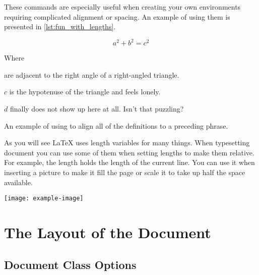 These commands are especially useful when creating your own environments
requiring complicated alignment or spacing. An example of using them is
presented in \autoref{lst:fun_with_lengths}.

\begin{listing}
  \begin{example}[vertical_mode, examplewidth=0.85\linewidth]
\newlength{\vardescindent}

\[  a^2+b^2=c^2 \]
\begin{vardesc}{Where}
  \item*[\(a\), \(b\)] are adjacent to the right angle
    of a right-angled triangle.
  \item[\(c\)] is the hypotenuse of the triangle and
    feels lonely.
  \item[\(d\)] finally does not show up here at all.
    Isn't that puzzling?
\end{vardesc}
\end{example}
  \caption{An example of using  to align all of the
    definitions to a preceding phrase.}\label{lst:fun_with_lengths}
\end{listing}

As you will see \LaTeX{} uses length variables for many things. When
typesetting document you can use some of them when setting lengths to make them
relative. For example, the  length holds the length of the
current line. You can use it when inserting a picture to make it fill the page
or scale it to take up half the space available.
\begin{example}
\texttt{[image: example-image]}
\end{example}

\section{The Layout of the Document}

\subsection{Document Class Options}\label{sec:documentclassoptions}

